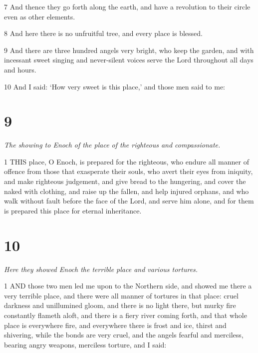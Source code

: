 \par 7 And thence they go forth along the earth, and have a revolution to their circle even as other elements.

\par 8 And here there is no unfruitful tree, and every place is blessed.

\par 9 And there are three hundred angels very bright, who keep the garden, and with incessant sweet singing and never-silent voices serve the Lord throughout all days and hours.

\par 10 And I said: ‘How very sweet is this place,’ and those men said to me:

\chapter{9}

\par \textit{The showing to Enoch of the place of the righteous and compassionate.}

\par 1 THIS place, O Enoch, is prepared for the righteous, who endure all manner of offence from those that exasperate their souls, who avert their eyes from iniquity, and make righteous judgement, and give bread to the hungering, and cover the naked with clothing, and raise up the fallen, and help injured orphans, and who walk without fault before the face of the Lord, and serve him alone, and for them is prepared this place for eternal inheritance.

\chapter{10}

\par \textit{Here they showed Enoch the terrible place and various tortures.}

\par 1 AND those two men led me upon to the Northern side, and showed me there a very terrible place, and there were all manner of tortures in that place: cruel darkness and unillumined gloom, and there is no light there, but murky fire constantly flameth aloft, and there is a fiery river coming forth, and that whole place is everywhere fire, and everywhere there is frost and ice, thirst and shivering, while the bonds are very cruel, and the angels fearful and merciless, bearing angry weapons, merciless torture, and I said:

